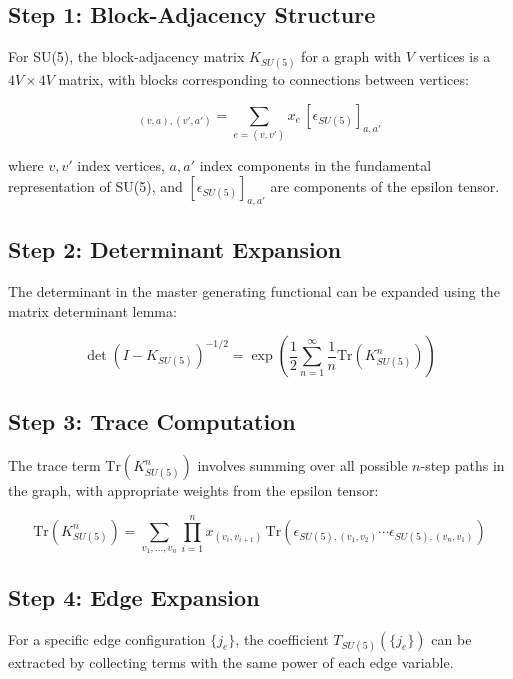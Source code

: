 \documentclass[11pt]{article}
\begin{document}
\subsection{Step 1: Block-Adjacency Structure}

For SU(5), the block-adjacency matrix $K_{SU(5)}$ for a graph with $V$ vertices is a $4V \times 4V$ matrix, with blocks corresponding to connections between vertices:

\begin{equation}
[K_{SU(5)}]_{(v,a),(v',a')} = \sum_{e=(v,v')} x_e \, [\epsilon_{SU(5)}]_{a,a'}
\end{equation}

where $v,v'$ index vertices, $a,a'$ index components in the fundamental representation of SU(5), and $[\epsilon_{SU(5)}]_{a,a'}$ are components of the epsilon tensor.

\subsection{Step 2: Determinant Expansion}

The determinant in the master generating functional can be expanded using the matrix determinant lemma:

\begin{equation}
\det(I - K_{SU(5)})^{-1/2} = \exp\left(\frac{1}{2} \sum_{n=1}^{\infty} \frac{1}{n} \text{Tr}(K_{SU(5)}^n)\right)
\end{equation}

\subsection{Step 3: Trace Computation}

The trace term $\text{Tr}(K_{SU(5)}^n)$ involves summing over all possible $n$-step paths in the graph, with appropriate weights from the epsilon tensor:

\begin{equation}
\text{Tr}(K_{SU(5)}^n) = \sum_{v_1,\ldots,v_n} \prod_{i=1}^{n} x_{(v_i,v_{i+1})} \, \text{Tr}(\epsilon_{SU(5), (v_1,v_2)} \cdots \epsilon_{SU(5), (v_n,v_1)})
\end{equation}

\subsection{Step 4: Edge Expansion}

For a specific edge configuration $\{j_e\}$, the coefficient $T_{SU(5)}(\{j_e\})$ can be extracted by collecting terms with the same power of each edge variable.
\end{document}
